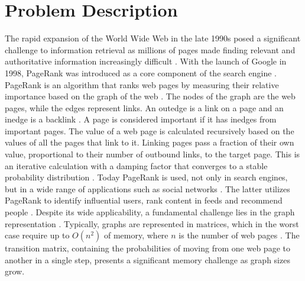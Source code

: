 \documentclass[a4paper,12pt]{article}
\begin{document}
\section{Problem Description}
The rapid expansion of the World Wide Web in the late 1990s posed a significant challenge to information retrieval as millions of pages made finding relevant and authoritative information increasingly difficult \cite{page_pagerank_1999}. With the launch of Google in 1998, PageRank was introduced as a core component of the search engine \cite{page_pagerank_1999}. PageRank is an algorithm that ranks web pages by measuring their relative importance based on the graph of the web \cite{page_pagerank_1999}. The nodes of the graph are the web pages, while the edges represent links. An outedge is a link on a page and an inedge is a backlink \cite{page_pagerank_1999}. A page is considered important if it has inedges from important pages. The value of a web page is calculated recursively based on the values of all the pages that link to it. Linking pages pass a fraction of their own value, proportional to their number of outbound links, to the target page. This is an iterative calculation with a damping factor that converges to a stable probability distribution \cite{page_pagerank_1999}.
Today PageRank is used, not only in search engines, but in a wide range of applications such as social networks \cite{wu_efficient_2024}. The latter utilizes PageRank to identify influential users, rank content in feeds and recommend people \cite{weng_twitterrank_2010}. Despite its wide applicability, a fundamental challenge lies in the graph representation \cite{liu_fast_2015}. Typically, graphs are represented in matrices, which in the worst case require up to $O(n^2)$ of memory, where $n$ is the number of web pages \cite{wu_efficient_2024}. The transition matrix, containing the probabilities of moving from one web page to another in a single step, presents a significant memory challenge as graph sizes grow. 
\end{document}
